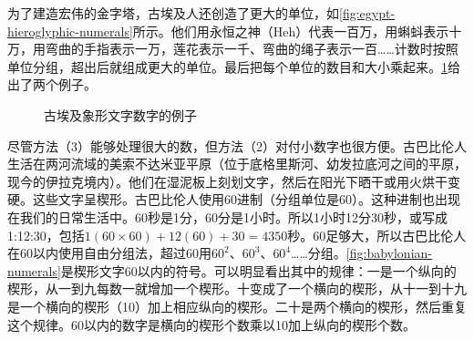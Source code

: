 \documentclass[b5paper]{ctexart}
\begin{document}
为了建造宏伟的金字塔，古埃及人还创造了更大的单位，如\cref{fig:egypt-hieroglyphic-numerals}所示。他们用永恒之神（Heh）代表一百万，用蝌蚪表示十万，用弯曲的手指表示一万，莲花表示一千、弯曲的绳子表示一百……计数时按照单位分组，超出后就组成更大的单位。最后把每个单位的数目和大小乘起来。\cref{fig:egypt-number-examples}给出了两个例子。

\begin{figure}[htbp]
 \centering
 \caption{古埃及象形文字数字的例子}
 \label{fig:egypt-number-examples}
\end{figure}

  
尽管方法（3）能够处理很大的数，但方法（2）对付小数字也很方便。古巴比伦人生活在两河流域的美索不达米亚平原（位于底格里斯河、幼发拉底河之间的平原，现今的伊拉克境内）。他们在湿泥板上刻划文字，然后在阳光下晒干或用火烘干变硬。这些文字呈楔形。古巴比伦人使用60进制（分组单位是60）。这种进制也出现在我们的日常生活中。60秒是1分，60分是1小时。所以1小时12分30秒，或写成1:12:30，包括$1(60\times 60) + 12(60) + 30 = 4350$秒。60足够大，所以古巴比伦人在60以内使用自由分组法，超过60用$60^2$、$60^3$、$60^4$……分组。\cref{fig:babylonian-numerals}是楔形文字60以内的符号。可以明显看出其中的规律：一是一个纵向的楔形，从一到九每数一就增加一个楔形。十变成了一个横向的楔形，从十一到十九是一个横向的楔形（10）加上相应纵向的楔形。二十是两个横向的楔形，然后重复这个规律。60以内的数字是横向的楔形个数乘以10加上纵向的楔形个数。
\end{document}

